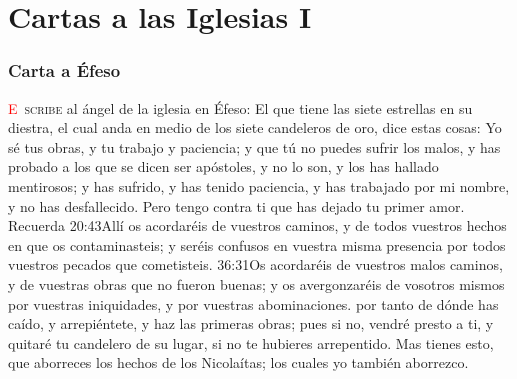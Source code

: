 \chapter{Cartas a las Iglesias I}
\subsection*{Carta a Éfeso}
\lettrine[lines=3]{\textcolor{red}{E}}{\ scribe} al ángel de la iglesia en Éfeso: 
\zz El que tiene las siete estrellas en su diestra, el cual anda en medio de los siete candeleros de oro, dice estas cosas:%
Yo sé tus obras, y tu trabajo y paciencia; y que tú no puedes sufrir los malos, y has probado a los que se dicen ser apóstoles, y no lo son, y los has hallado mentirosos; %
y has sufrido, y has tenido paciencia, y has trabajado por mi nombre, y no has desfallecido. %
Pero tengo contra ti que has dejado tu primer amor.%
Recuerda%
				{20:43}{Allí os acordaréis de vuestros caminos, y de todos vuestros hechos en que os contaminasteis; y seréis confusos en vuestra misma presencia por todos vuestros pecados que cometisteis.}%
				{36:31}{Os acordaréis de vuestros malos caminos, y de vuestras obras que no fueron buenas; y os avergonzaréis de vosotros mismos por vuestras iniquidades, y por vuestras abominaciones.} %
por tanto de dónde has caído, y arrepiéntete, y haz las primeras obras; pues si no, vendré presto a ti, y quitaré tu candelero de su lugar, si no te hubieres arrepentido. %
Mas tienes esto, que aborreces los hechos de los Nicolaítas; los cuales yo también aborrezco.%
